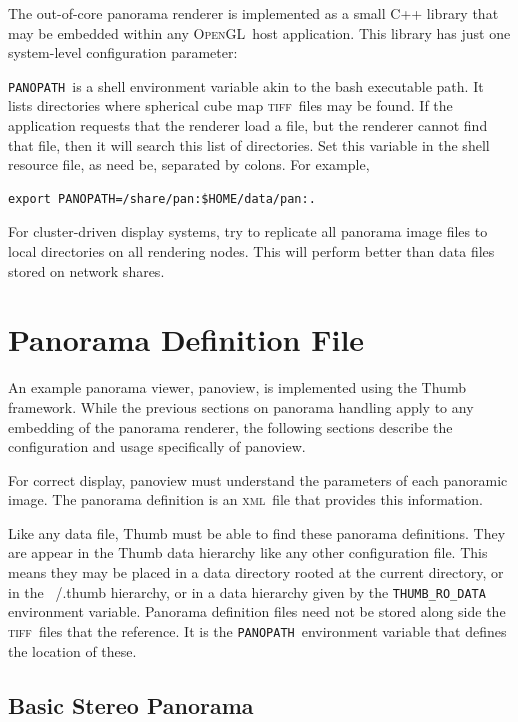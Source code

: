\documentclass[oneside,11pt]{memoir}
\newcommand{\opengl}  {\textsc{OpenGL}}
\newcommand{\tiff}    {\textsc{tiff}}
\newcommand{\xml}     {\textsc{xml}}
\newcommand{\panopath}{\texttt{PANOPATH}}
\begin{document}
\begin{Spacing}{1.1}
The out-of-core panorama renderer is implemented as a small C++ library that may be embedded within any \opengl\ host application. This library has just one system-level configuration parameter:

\panopath\ is a shell environment variable akin to the bash executable path. It lists directories where spherical cube map \tiff\ files may be found. If the application requests that the renderer load a file, but the renderer cannot find that file, then it will search this list of directories. Set this variable in the shell resource file, as need be, separated by colons. For example,

\begin{verbatim}
export PANOPATH=/share/pan:$HOME/data/pan:.
\end{verbatim}

For cluster-driven display systems, try to replicate all panorama image files to local directories on all rendering nodes. This will perform better than data files stored on network shares.

\section{Panorama Definition File}

An example panorama viewer, panoview, is implemented using the Thumb framework. While the previous sections on panorama handling apply to any embedding of the panorama renderer, the following sections describe the configuration and usage specifically of panoview.

For correct display, panoview must understand the parameters of each panoramic image. The panorama definition is an \xml\ file that provides this information.

Like any data file, Thumb must be able to find these panorama definitions. They are appear in the Thumb data hierarchy like any other configuration file. This means they may be placed in a data directory rooted at the current directory, or in the ~/.thumb hierarchy, or in a data hierarchy given by the \texttt{THUMB\_RO\_DATA} environment variable. Panorama definition files need not be stored along side the \tiff\ files that the reference. It is the \panopath\ environment variable that defines the location of these.

\subsection{Basic Stereo Panorama}


\end{Spacing}
\end{document}
